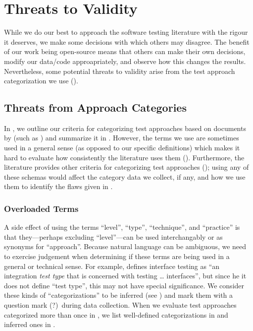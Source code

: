 \section{Threats to Validity}\label{threats}

While we do our best to approach the software testing literature with the
rigour it deserves, we make some decisions with which others may disagree. The
benefit of our work being open-source means that others can make their own
decisions, modify our data/code approapriately, and observe how this changes
the results. Nevertheless, some potential threats to validity arise from the
test approach categorization we use ().

\subsection{Threats from Approach Categories}\label{cat-threats}

In , we outline our criteria for categorizing test approaches
based on documents by \citeauthor{IEEE2022} (such as \citeyear[Fig.~2]{IEEE2022})
and summarize it in . However, the terms we use are
sometimes used in a general sense (as opposed to our specific definitions)
which makes it hard to evaluate how consistently the literature uses them
(). Furthermore, the literature provides other criteria
for categorizing test approaches (); using any of these schemas
would affect the category data we collect, if any, and how we use them to
identify the flaws given in .

\subsubsection{Overloaded Terms}\label{overloaded-cats}

A side effect of using the terms ``level'', ``type'', ``technique'', and
``practice'' is that they---perhaps excluding ``level''---can be used
interchangably or as synonyms for ``approach''. Because natural language can be
ambiguous, we need to exercise judgement when determining if these terms are
being used in a general or technical sense. For example,
\citet[p.~45\ifnotpaper, emphasis added\fi]{Kam2008}
defines interface testing as ``an integration \emph{test type} that is
concerned with testing \dots{} interfaces'', but since \ifnotpaper he \else it
\fi does not define ``test type'', this may not have special significance.
\ifnotpaper We consider these kinds of ``categorizations'' to be
    inferred (see ) and mark them with a question mark (?)~during
    data collection. When we evaluate test approaches categorized more than
    once in , we list well-defined categorizations in
     and inferred ones in .
\fi

